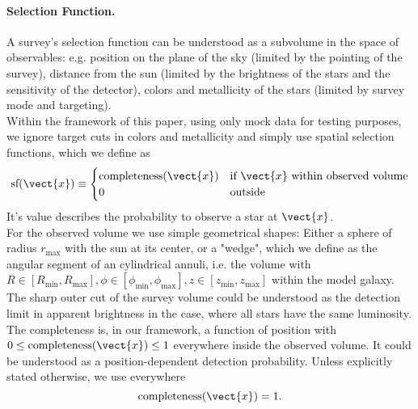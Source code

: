 \paragraph{Selection Function.} A survey's selection function can be understood as a subvolume in the space of observables: e.g. position on the plane of the sky (limited by the pointing of the survey), distance from the sun (limited by the brightness of the stars and the sensitivity of the detector), colors and metallicity of the stars (limited by survey mode and targeting).
\\Within the framework of this paper, using only mock data for testing purposes, we ignore target cuts in colors and metallicity and simply use spatial selection functions, which we define as
\begin{eqnarray*}
\text{sf}(\vect{x}) \equiv \begin{cases}
\text{completeness}(\vect{x}) &\text{if $\vect{x}$ within observed volume}\\
0 & \text{outside}
\end{cases}
\end{eqnarray*}
It's value describes the probability to observe a star at $\vect{x}$. 
\\For the observed volume we use simple geometrical shapes: Either a sphere of radius $r_\text{max}$ with the sun at its center, or a "wedge", which we define as the angular segment of an cylindrical annuli, i.e. the volume with $R \in [R_\text{min},R_\text{max}],\phi \in [\phi_\text{min},\phi_\text{max}],z \in [z_\text{min},z_\text{max}]$ within the model galaxy. The sharp outer cut of the survey volume could be understood as the detection limit in apparent brightness in the case, where all stars have the same luminosity.
\\The completeness is, in our framework, a function of position with $0 \leq \text{completeness}(\vect{x}) \leq 1$ everywhere inside the observed volume. It could be understood as a position-dependent detection probability. Unless explicitly stated otherwise, we use everywhere
$$\text{completeness}(\vect{x}) = 1.$$